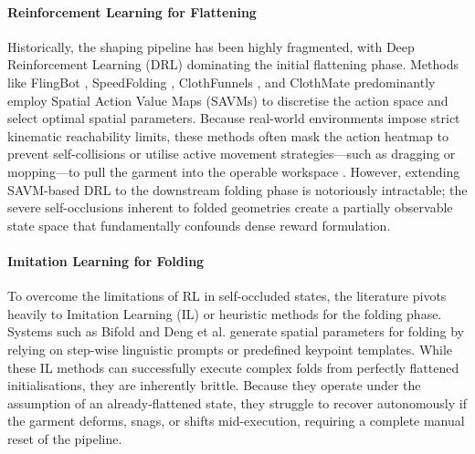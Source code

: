 \documentclass[journal]{IEEEtran}
\begin{document}
\paragraph{Reinforcement Learning for Flattening} Historically, the shaping pipeline has been highly fragmented, with Deep Reinforcement Learning (DRL) dominating the initial flattening phase. Methods like FlingBot \cite{ha2022flingbot}, SpeedFolding \cite{avigal2022speedfolding}, ClothFunnels \cite{canberk2022cloth}, and ClothMate \cite{luo2025clothmate} predominantly employ Spatial Action Value Maps (SAVMs) \cite{lee2021learning} to discretise the action space and select optimal spatial parameters. Because real-world environments impose strict kinematic reachability limits, these methods often mask the action heatmap to prevent self-collisions or utilise active movement strategies—such as dragging or mopping—to pull the garment into the operable workspace \cite{xue2023unifolding}. However, extending SAVM-based DRL to the downstream folding phase is notoriously intractable; the severe self-occlusions inherent to folded geometries create a partially observable state space that fundamentally confounds dense reward formulation.

\paragraph{Imitation Learning for Folding} To overcome the limitations of RL in self-occluded states, the literature pivots heavily to Imitation Learning (IL) \cite{weng2022fabricflownet, kadi2025draper} or heuristic methods \cite{canberk2022cloth} for the folding phase. Systems such as Bifold \cite{barbany2025bifold} and Deng et al. \cite{deng2024learning} generate spatial parameters for folding by relying on step-wise linguistic prompts or predefined keypoint templates. While these IL methods can successfully execute complex folds from perfectly flattened initialisations, they are inherently brittle. Because they operate under the assumption of an already-flattened state, they struggle to recover autonomously if the garment deforms, snags, or shifts mid-execution, requiring a complete manual reset of the pipeline.
\end{document}
